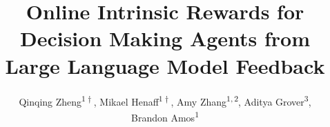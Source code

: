 \documentclass[10pt]{article}
\title{Online Intrinsic Rewards for Decision Making Agents from Large Language Model Feedback}
\author{Qinqing Zheng\textsuperscript{$1\dagger$}, 
Mikael Henaff\textsuperscript{$1\dagger$}, 
Amy Zhang\textsuperscript{$1,2$},
Aditya Grover\textsuperscript{$3$}, \\
Brandon Amos\textsuperscript{$1$}
}
\begin{document}
%
\maketitle  %












\clearpage
\onecolumn
\appendix

\end{document}

